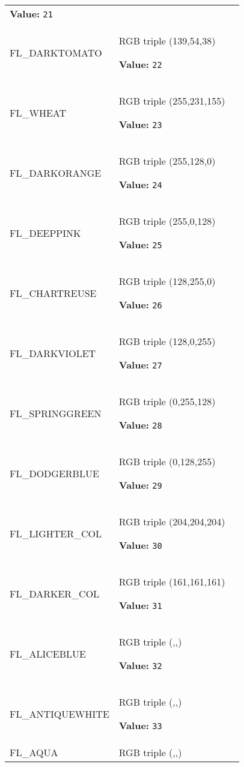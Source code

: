 \begin{longtable}{|p{\varnamewidth}|p{\vardescrwidth}|l}
\textbf{Value:} 
{\tt 21}&\\
\cline{1-2}
\raggedright F\-L\-\_\-D\-A\-R\-K\-T\-O\-M\-A\-T\-O\- & \raggedright RGB triple (139,54,38)

\textbf{Value:} 
{\tt 22}&\\
\cline{1-2}
\raggedright F\-L\-\_\-W\-H\-E\-A\-T\- & \raggedright RGB triple (255,231,155)

\textbf{Value:} 
{\tt 23}&\\
\cline{1-2}
\raggedright F\-L\-\_\-D\-A\-R\-K\-O\-R\-A\-N\-G\-E\- & \raggedright RGB triple (255,128,0)

\textbf{Value:} 
{\tt 24}&\\
\cline{1-2}
\raggedright F\-L\-\_\-D\-E\-E\-P\-P\-I\-N\-K\- & \raggedright RGB triple (255,0,128)

\textbf{Value:} 
{\tt 25}&\\
\cline{1-2}
\raggedright F\-L\-\_\-C\-H\-A\-R\-T\-R\-E\-U\-S\-E\- & \raggedright RGB triple (128,255,0)

\textbf{Value:} 
{\tt 26}&\\
\cline{1-2}
\raggedright F\-L\-\_\-D\-A\-R\-K\-V\-I\-O\-L\-E\-T\- & \raggedright RGB triple (128,0,255)

\textbf{Value:} 
{\tt 27}&\\
\cline{1-2}
\raggedright F\-L\-\_\-S\-P\-R\-I\-N\-G\-G\-R\-E\-E\-N\- & \raggedright RGB triple (0,255,128)

\textbf{Value:} 
{\tt 28}&\\
\cline{1-2}
\raggedright F\-L\-\_\-D\-O\-D\-G\-E\-R\-B\-L\-U\-E\- & \raggedright RGB triple (0,128,255)

\textbf{Value:} 
{\tt 29}&\\
\cline{1-2}
\raggedright F\-L\-\_\-L\-I\-G\-H\-T\-E\-R\-\_\-C\-O\-L\-1\- & \raggedright RGB triple (204,204,204)

\textbf{Value:} 
{\tt 30}&\\
\cline{1-2}
\raggedright F\-L\-\_\-D\-A\-R\-K\-E\-R\-\_\-C\-O\-L\-1\- & \raggedright RGB triple (161,161,161)

\textbf{Value:} 
{\tt 31}&\\
\cline{1-2}
\raggedright F\-L\-\_\-A\-L\-I\-C\-E\-B\-L\-U\-E\- & \raggedright RGB triple (,,)

\textbf{Value:} 
{\tt 32}&\\
\cline{1-2}
\raggedright F\-L\-\_\-A\-N\-T\-I\-Q\-U\-E\-W\-H\-I\-T\-E\- & \raggedright RGB triple (,,)

\textbf{Value:} 
{\tt 33}&\\
\cline{1-2}
\raggedright F\-L\-\_\-A\-Q\-U\-A\- & \raggedright RGB triple (,,)


\end{longtable}
